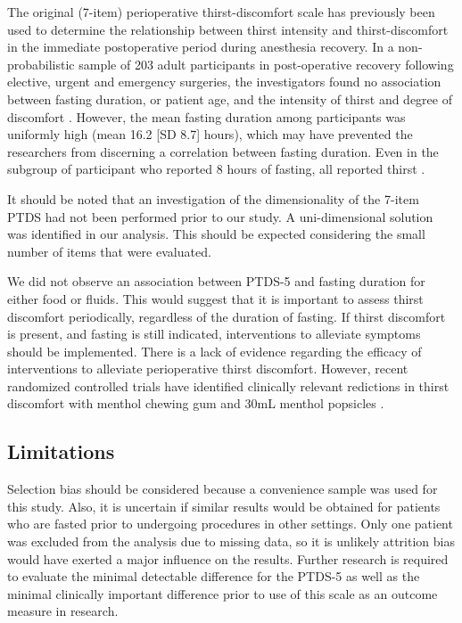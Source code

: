 \documentclass[12pt,twocolumn,twoside,]{pinp}
\begin{document}
The original (7-item) perioperative thirst-discomfort scale has
previously been used to determine the relationship between thirst
intensity and thirst-discomfort in the immediate postoperative period
during anesthesia recovery.\citep{Pierotti_2018} In a non-probabilistic
sample of 203 adult participants in post-operative recovery following
elective, urgent and emergency surgeries, the investigators found no
association between fasting duration, or patient age, and the intensity
of thirst and degree of discomfort \citep{Pierotti_2018}. However, the
mean fasting duration among participants was uniformly high (mean 16.2
{[}SD 8.7{]} hours), which may have prevented the researchers from
discerning a correlation between fasting duration. Even in the subgroup
of participant who reported 8 hours of fasting, all reported thirst
\citep{aroni2012assessment, Pierotti_2018}.

It should be noted that an investigation of the dimensionality of the
7-item PTDS had not been performed prior to our study. A uni-dimensional
solution was identified in our analysis. This should be expected
considering the small number of items that were evaluated.

We did not observe an association between PTDS-5 and fasting duration
for either food or fluids. This would suggest that it is important to
assess thirst discomfort periodically, regardless of the duration of
fasting. If thirst discomfort is present, and fasting is still
indicated, interventions to alleviate symptoms should be implemented.
There is a lack of evidence regarding the efficacy of interventions to
alleviate perioperative thirst discomfort. However, recent randomized
controlled trials have identified clinically relevant redictions in
thirst discomfort with menthol chewing gum and 30mL menthol popsicles
\citep{garcia2019, nascimento2020}.

\hypertarget{limitations}{%
\subsection{Limitations}\label{limitations}}

Selection bias should be considered because a convenience sample was
used for this study. Also, it is uncertain if similar results would be
obtained for patients who are fasted prior to undergoing procedures in
other settings. Only one patient was excluded from the analysis due to
missing data, so it is unlikely attrition bias would have exerted a
major influence on the results. Further research is required to evaluate
the minimal detectable difference for the PTDS-5 as well as the minimal
clinically important difference prior to use of this scale as an outcome
measure in research.
\end{document}
